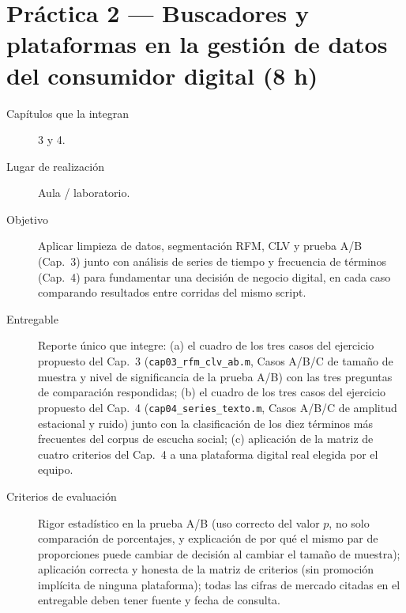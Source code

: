 \section*{Práctica 2 — Buscadores y plataformas en la gestión de datos del consumidor digital (8 h)}

\begin{description}
  \item[Capítulos que la integran] 3 y 4.
  \item[Lugar de realización] Aula / laboratorio.
  \item[Objetivo] Aplicar limpieza de datos, segmentación RFM, CLV y prueba
  A/B (Cap.~3) junto con análisis de series de tiempo y frecuencia de
  términos (Cap.~4) para fundamentar una decisión de negocio digital, en
  cada caso comparando resultados entre corridas del mismo script.
  \item[Entregable] Reporte único que integre: (a) el cuadro de los tres
  casos del ejercicio propuesto del Cap.~3
  (\texttt{cap03\_rfm\_clv\_ab.m}, Casos A/B/C de tamaño de muestra y nivel
  de significancia de la prueba A/B) con las tres preguntas de comparación
  respondidas; (b) el cuadro de los tres casos del ejercicio propuesto del
  Cap.~4 (\texttt{cap04\_series\_texto.m}, Casos A/B/C de amplitud
  estacional y ruido) junto con la clasificación de los diez términos más
  frecuentes del corpus de escucha social; (c) aplicación de la matriz de
  cuatro criterios del Cap.~4 a una plataforma digital real elegida por el
  equipo.
  \item[Criterios de evaluación] Rigor estadístico en la prueba A/B (uso
  correcto del valor $p$, no solo comparación de porcentajes, y explicación
  de por qué el mismo par de proporciones puede cambiar de decisión al
  cambiar el tamaño de muestra); aplicación correcta y honesta de la matriz
  de criterios (sin promoción implícita de ninguna plataforma); todas las
  cifras de mercado citadas en el entregable deben tener fuente y fecha de
  consulta.
\end{description}

